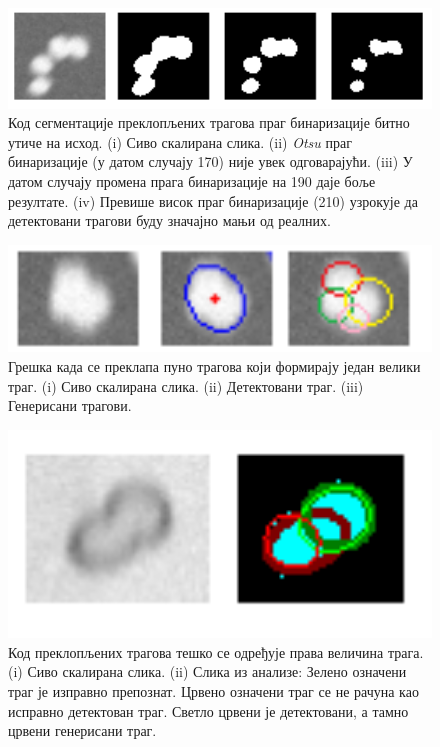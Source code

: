 \documentclass[12pt,a4paper,serbian,oneside]{book}
\begin{document}
\begin{figure}[H]
\begin{center}
\includegraphics[width=150mm]{images/binthresh.png}
\end{center}
\caption{Код сегментације преклопљених трагова праг бинаризације битно утиче на исход. (i) Сиво скалирана слика. (ii) \textit{Otsu}  праг бинаризације (у датом случају 170) није увек одговарајући. (iii) У датом случају промена прага бинаризације на 190 даје боље резултате. (iv) Превише висок праг бинаризације (210) узрокује да детектовани трагови буду значајно мањи од реалних. }
\label{fig:binthresh}
\end{figure}

\begin{figure}[H]
\begin{center}
\includegraphics[width=150mm]{images/multi.png}
\end{center}
\caption{Грешка када се преклапа пуно трагова који формирају један велики траг. (i) Сиво скалирана слика. (ii) Детектовани траг.  (iii) Генерисани трагови. }
\label{fig:multi}
\end{figure}

\begin{figure}[H]
\begin{center}
\includegraphics[width=150mm]{images/small.png}
\end{center}
\caption{Код преклопљених трагова тешко се одређује права величина трага. (i)  Сиво скалирана слика. (ii) Слика из анализе: Зелено означени траг је изправно препознат. Црвено означени траг се не рачуна као исправно детектован траг. Светло црвени је детектовани, а тамно црвени генерисани траг. }
\label{fig:small}
\end{figure}
\end{document}
